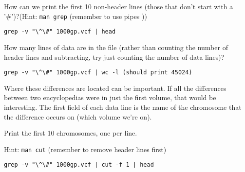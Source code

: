 \begin{questions}
How can we print the first 10 non-header lines (those that don't start with a '\#')?(Hint: \texttt{man grep} (remember to use pipes \texttt{\textbar}))
\begin{answer}
\begin{lstlisting}
grep -v "\^\#" 1000gp.vcf | head  
\end{lstlisting}
\end{answer}
\end{questions}

\begin{questions}
How many lines of data are in the file (rather than counting the number of header lines and subtracting, try just counting the number of data lines)? \\
\begin{answer}
\begin{lstlisting}
grep -v "\^\#" 1000gp.vcf | wc -l (should print 45024)
\end{lstlisting}
\end{answer}
\end{questions}

\begin{note}
Where these differences are located can be important. If all the differences between two encyclopedias were in just the first volume, that would be interesting. The first field of each data line is the name of the chromosome that the difference occurs on (which volume we're on). 
\end{note}

\begin{questions}
Print the first 10 chromosomes, one per line. 

Hint: \texttt{man cut} (remember to remove header lines first)
\begin{answer}
\begin{lstlisting}
grep -v "\^\#" 1000gp.vcf | cut -f 1 | head
\end{lstlisting}
\end{answer}
\end{questions}

